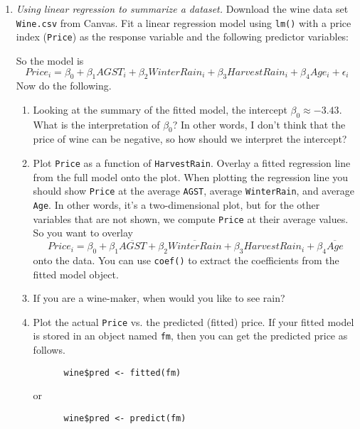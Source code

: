 \begin{enumerate}
\item \emph{Using linear regression to summarize a dataset.}
  Download the wine data set \texttt{Wine.csv} from Canvas. Fit a
  linear regression model using \texttt{lm()} with a price index
  (\texttt{Price}) as the response variable and the following
  predictor variables:
    So the model is
    \[ Price_i = \beta_0 + \beta_1 AGST_i + \beta_2 WinterRain_i +
      \beta_3 HarvestRain_i + \beta_4 Age_i + \epsilon_i \]
    Now do the following.
    \begin{enumerate}
    \item Looking at the summary of the fitted model, the intercept
      $\beta_0 \approx -3.43$. What is the interpretation of $\beta_0$?
      In other words, I don't think that the price of wine can be negative,
      so how should we interpret the intercept?
  \item Plot \texttt{Price} as a function of
    \texttt{HarvestRain}. Overlay a fitted regression line from the
    full model onto the plot.  When plotting the regression line you
    should show \texttt{Price} at the average \texttt{AGST}, average
    \texttt{WinterRain}, and average \texttt{Age}.
    In other words, it's a two-dimensional plot, but for the other
    variables that are not shown, we compute \texttt{Price} at their
    average values. So you want to overlay
    \[ Price_i = \beta_0 + \beta_1 \overline{AGST} +
      \beta_2 \overline{WinterRain} +
      \beta_3 HarvestRain_i +
      \beta_4 \overline{Age} \]
    onto the data. You can use \texttt{coef()} to extract the
    coefficients from the fitted model object.

  \item If you are a wine-maker, when would you like to see
    rain?

  \item Plot the actual \texttt{Price} vs. the predicted (fitted)
    price. If your fitted model is stored in an object named
    \texttt{fm}, then you can get the predicted price as follows.
    \begin{Verbatim}
      wine$pred <- fitted(fm)
    \end{Verbatim}
    or
    \begin{Verbatim}
      wine$pred <- predict(fm)
    \end{Verbatim}


\end{enumerate}
\end{enumerate}
